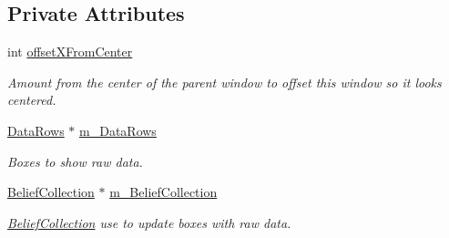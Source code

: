 \subsection*{Private Attributes}
\begin{DoxyCompactItemize}
\item 
\hypertarget{class_raw_data_dialog_a82f90333dea07918db272ec85e947f28}{
int \hyperlink{class_raw_data_dialog_a82f90333dea07918db272ec85e947f28}{offsetXFromCenter}}
\label{class_raw_data_dialog_a82f90333dea07918db272ec85e947f28}

\begin{DoxyCompactList}\small\item\em Amount from the center of the parent window to offset this window so it looks centered. \end{DoxyCompactList}\item 
\hypertarget{class_raw_data_dialog_a42980546af89335a7511499e522b9453}{
\hyperlink{struct_data_rows}{DataRows} $\ast$ \hyperlink{class_raw_data_dialog_a42980546af89335a7511499e522b9453}{m\_\-DataRows}}
\label{class_raw_data_dialog_a42980546af89335a7511499e522b9453}

\begin{DoxyCompactList}\small\item\em Boxes to show raw data. \end{DoxyCompactList}\item 
\hypertarget{class_raw_data_dialog_a9f51dabc099b54fd525a3512d2c63ed6}{
\hyperlink{class_belief_collection}{BeliefCollection} $\ast$ \hyperlink{class_raw_data_dialog_a9f51dabc099b54fd525a3512d2c63ed6}{m\_\-BeliefCollection}}
\label{class_raw_data_dialog_a9f51dabc099b54fd525a3512d2c63ed6}

\begin{DoxyCompactList}\small\item\em \hyperlink{class_belief_collection}{BeliefCollection} use to update boxes with raw data. \end{DoxyCompactList}\end{DoxyCompactItemize}
